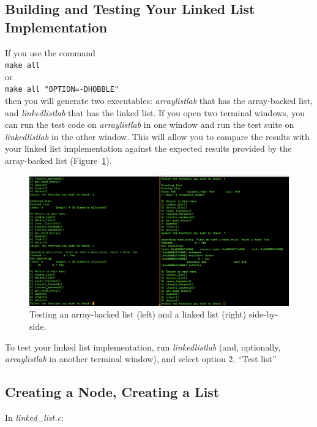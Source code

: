 \subsection{Building and Testing Your Linked List Implementation}

If you use the command \\
\verb+make all+ \\
or \\
\verb+make all "OPTION=-DHOBBLE"+ \\
then you will generate two executables: \textit{arraylistlab} that has the array-backed list, and \textit{linkedlistlab} that has the linked list.
If you open two terminal windows, you can run the test code on \textit{arraylistlab} in one window and run the test suite on \textit{linkedlistlab} in the other window.
This will allow you to compare the results with your linked list implementation against the expected results provided by the array-backed list (Figure~\ref{fig:SideBySideTesting}).

\begin{figure}
    \centering
    \includegraphics[width=6in]{SideBySideTesting}
    \caption{Testing an array-backed list (left) and a linked list (right) side-by-side.}
    \label{fig:SideBySideTesting}
\end{figure}

To test your linked list implementation, run \textit{linkedlistlab} (and, optionally, \textit{arraylistlab} in another terminal window),
and select option 2, ``Test list''


\subsection{Creating a Node, Creating a List}

In \textit{linked\_list.c}:

\begin{description}
\end{description}

